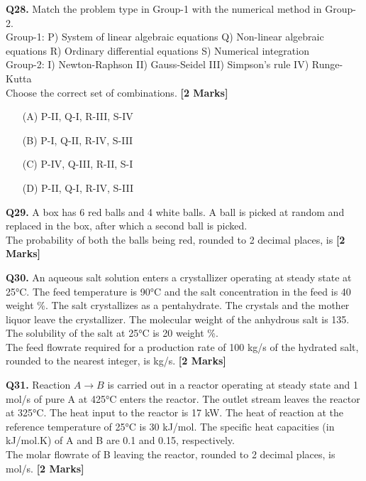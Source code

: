 \documentclass[11pt]{article}
\newcommand{\questionb}[2]{
    \noindent\textbf{Q#2.} #1 \hfill \textbf{[2 Marks]}
}
\begin{document}
\questionb{Match the problem type in Group-1 with the numerical method in Group-2.  
\\ Group-1: P) System of linear algebraic equations Q) Non-linear algebraic equations R) Ordinary differential equations S) Numerical integration  
\\ Group-2: I) Newton-Raphson II) Gauss-Seidel III) Simpson’s rule IV) Runge-Kutta  
\\ Choose the correct set of combinations.}{28}
\begin{enumerate}
    \item[(A)] P-II, Q-I, R-III, S-IV  
    \item[(B)] P-I, Q-II, R-IV, S-III  
    \item[(C)] P-IV, Q-III, R-II, S-I  
    \item[(D)] P-II, Q-I, R-IV, S-III  
\end{enumerate}
\vspace{0.5cm}

\questionb{A box has 6 red balls and 4 white balls. A ball is picked at random and replaced in the box, after which a second ball is picked. \\  
The probability of both the balls being red, rounded to 2 decimal places, is}{29}
\vspace{0.5cm}

\questionb{An aqueous salt solution enters a crystallizer operating at steady state at 25°C. The feed temperature is 90°C and the salt concentration in the feed is 40 weight \%. The salt crystallizes as a pentahydrate. The crystals and the mother liquor leave the crystallizer. The molecular weight of the anhydrous salt is 135. The solubility of the salt at 25°C is 20 weight \%. \\  
The feed flowrate required for a production rate of 100 kg/s of the hydrated salt, rounded to the nearest integer, is kg/s.}{30}
\vspace{0.5cm}

\questionb{Reaction \( A \rightarrow B \) is carried out in a reactor operating at steady state and 1 mol/s of pure A at 425°C enters the reactor. The outlet stream leaves the reactor at 325°C. The heat input to the reactor is 17 kW. The heat of reaction at the reference temperature of 25°C is 30 kJ/mol. The specific heat capacities (in kJ/mol.K) of A and B are 0.1 and 0.15, respectively. \\  
The molar flowrate of B leaving the reactor, rounded to 2 decimal places, is mol/s.}{31}
\vspace{0.5cm}
\end{document}
